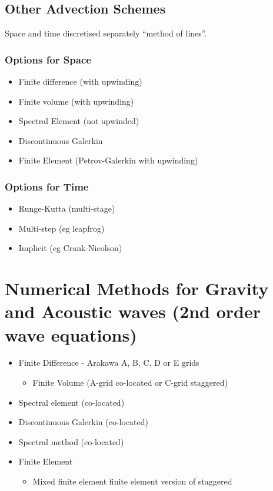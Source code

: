 \clearpage{}

\subsection{Other Advection Schemes}

Space and time discretised separately \textendash{} ``method of lines''. 

\begin{minipage}[t]{0.48\columnwidth}%

\subsubsection*{Options for Space}
\begin{itemize}
\item Finite difference (with upwinding)
\item Finite volume (with upwinding)
\item Spectral Element (not upwinded)
\item Discontinuous Galerkin
\item Finite Element (Petrov-Galerkin with upwinding)
\end{itemize}
%
\end{minipage} %
\begin{minipage}[t]{0.48\columnwidth}%

\subsubsection*{Options for Time}
\begin{itemize}
\item Runge-Kutta (multi-stage)
\item Multi-step (eg leapfrog)
\item Implicit (eg Crank-Nicolson)
\end{itemize}
%
\end{minipage}

\clearpage{}

\section{Numerical Methods for Gravity and Acoustic waves (2nd order wave
equations)}
\begin{itemize}
\item Finite Difference - Arakawa A, B, C, D or E grids \citep{AL77}
\begin{itemize}
\item Finite Volume (A-grid \textendash{} co-located or C-grid \textendash{}
staggered)
\end{itemize}
\item Spectral element (co-located)
\item Discontinuous Galerkin (co-located)
\item Spectral method (co-located)
\item Finite Element
\begin{itemize}
\item Mixed finite element \textendash{} finite element version of staggered
\end{itemize}
\end{itemize}
\clearpage{}

